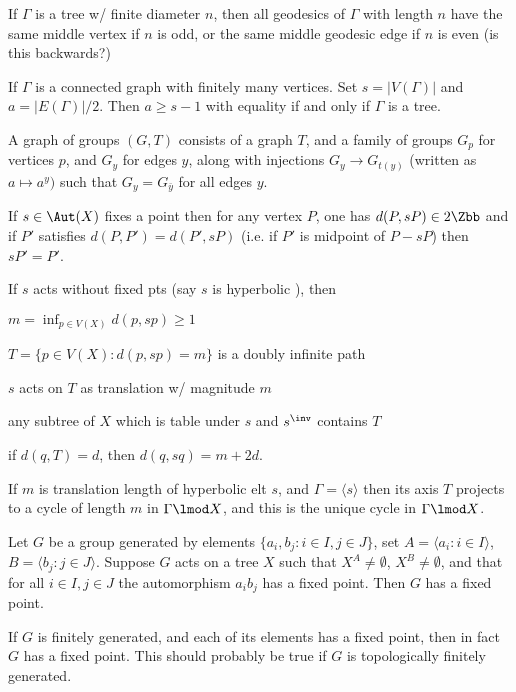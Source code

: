 \documentclass{article}
\begin{document}
If $\Gamma$ is a tree w/ finite diameter $n$, then all geodesics of $\Gamma$ with length $n$ have the same middle vertex if $n$ is odd, or the same middle geodesic edge if $n$ is even (is this backwards?)

If $\Gamma$ is a connected graph with finitely many vertices. Set $s= |V(\Gamma)|$ and $a=|E(\Gamma)|/2$. Then $a\geq s-1$ with equality if and only if $\Gamma$ is a tree.

A graph of groups $(G,T)$ consists of a graph $T$, and a family of groups $G_p$ for vertices $p$, and  $G_y$ for edges $y$, along with injections $G_y \to G_{t(y)}$ (written as $a \mapsto a^y)$ such that $G_y = G_{\bar{y}}$ for all edges $y$.

If $s \in \Aut(X)$ fixes a point then for any vertex $P$, one has $d(P,sP) \in 2\Zbb$ and if $P'$ satisfies $d(P,P')=d(P',sP)$ (i.e. if $P'$ is midpoint of $P-sP$) then $sP'=P'$.

If $s$ acts without fixed pts (say $s$ is hyperbolic ), then \begin{enumerate*}
    \item  $m = \inf_{p \in V(X)} d(p,sp) \geq 1$
    \item  $T = \{p \in V(X): d(p,sp)=m\}$ is a doubly infinite path
    \item $s$ acts on $T$ as translation w/ magnitude $m$
    \item any subtree of $X$ which is table under $s$ and $s^\inv$ contains $T$
    \item if $d(q,T)=d$, then $d(q,sq)=m+2d$.
\end{enumerate*}

If $m$ is translation length of hyperbolic elt $s$,  and $\Gamma = \langle s \rangle$ then its axis $T$ projects to a cycle of length $m$ in $\Gamma \lmod X$, and this is the unique cycle in $\Gamma \lmod X$.


\begin{proposition}
    Let  $G$ be a group generated by elements $\{a_i,b_j: i \in I,j\in J\}$, set $A=\langle a_i : i \in I\rangle $, $B=\langle b_j:j\in J \rangle$. Suppose $G$ acts on a tree $X$ such that $X^A\neq \emptyset$, $X^B\neq \emptyset$, and that for all $i \in I,j\in J$  the automorphism $a_ib_j$ has a fixed point. Then $G$ has a fixed point.
\end{proposition}

If $G$ is finitely generated, and each of its elements has a fixed point, then in fact $G$ has a fixed point. This should probably be true if $G$ is topologically finitely generated.
\end{document}
